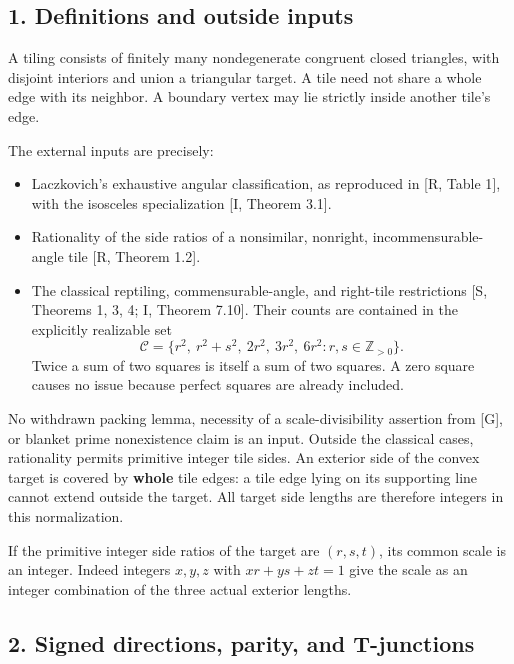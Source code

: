 \documentclass[
  11pt,
]{article}
\providecommand{\tightlist}{%
  \setlength{\itemsep}{0pt}\setlength{\parskip}{0pt}}
\begin{document}
\subsection{1. Definitions and outside
inputs}\label{definitions-and-outside-inputs}

A tiling consists of finitely many nondegenerate congruent closed
triangles, with disjoint interiors and union a triangular target. A tile
need not share a whole edge with its neighbor. A boundary vertex may lie
strictly inside another tile's edge.

The external inputs are precisely:

\begin{itemize}
\tightlist
\item
  Laczkovich's exhaustive angular classification, as reproduced in {[}R,
  Table 1{]}, with the isosceles specialization {[}I, Theorem 3.1{]}.
\item
  Rationality of the side ratios of a nonsimilar, nonright,
  incommensurable-angle tile {[}R, Theorem 1.2{]}.
\item
  The classical reptiling, commensurable-angle, and right-tile
  restrictions {[}S, Theorems 1, 3, 4; I, Theorem 7.10{]}. Their counts
  are contained in the explicitly realizable set
  \[\mathcal C=\{r^2,\ r^2+s^2,\ 2r^2,\ 3r^2,\ 6r^2:r,s\in\mathbb Z_{>0}\}.\]
  Twice a sum of two squares is itself a sum of two squares. A zero
  square causes no issue because perfect squares are already included.
\end{itemize}

No withdrawn packing lemma, necessity of a scale-divisibility assertion
from {[}G{]}, or blanket prime nonexistence claim is an input. Outside
the classical cases, rationality permits primitive integer tile sides.
An exterior side of the convex target is covered by \textbf{whole} tile
edges: a tile edge lying on its supporting line cannot extend outside
the target. All target side lengths are therefore integers in this
normalization.

If the primitive integer side ratios of the target are \((r,s,t)\), its
common scale is an integer. Indeed integers \(x,y,z\) with
\(xr+ys+zt=1\) give the scale as an integer combination of the three
actual exterior lengths.

\subsection{2. Signed directions, parity, and
T-junctions}\label{signed-directions-parity-and-t-junctions}
\end{document}

